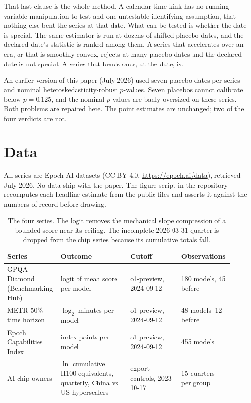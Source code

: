 \documentclass[11pt]{article}
\begin{document}
That last clause is the whole method. A calendar-time kink has no running-variable
manipulation to test and one untestable identifying assumption, that nothing else bent
the series at that date. What can be tested is whether the date is special. The same
estimator is run at dozens of shifted placebo dates, and the declared date's statistic
is ranked among them. A series that accelerates over an era, or that is smoothly convex,
rejects at many placebo dates and the declared date is not special. A series that bends
once, at the date, is.

An earlier version of this paper (July 2026) used seven placebo dates per series and
nominal heteroskedasticity-robust $p$-values. Seven placebos cannot calibrate below
$p = 0.125$, and the nominal $p$-values are badly oversized on these series. Both
problems are repaired here. The point estimates are unchanged; two of the four verdicts
are not.

\section{Data}\label{sec:data}

All series are Epoch AI datasets (CC-BY 4.0, \url{https://epoch.ai/data}), retrieved
July 2026. No data ship with the paper. The figure script in the repository recomputes
each headline estimate from the public files and asserts it against the numbers of
record before drawing.

\begin{table}[h]
\centering
\small
\begin{tabular}{@{}p{0.23\linewidth}p{0.30\linewidth}p{0.22\linewidth}p{0.17\linewidth}@{}}
\toprule
Series & Outcome & Cutoff & Observations \\
\midrule
GPQA-Diamond (Benchmarking Hub) & logit of mean score per model & o1-preview, 2024-09-12 & 180 models, 45 before \\
METR 50\% time horizon & $\log_2$ minutes per model & o1-preview, 2024-09-12 & 48 models, 12 before \\
Epoch Capabilities Index & index points per model & o1-preview, 2024-09-12 & 455 models \\
AI chip owners & $\ln$ cumulative H100-equivalents, quarterly, China vs US hyperscalers & export controls, 2023-10-17 & 15 quarters per group \\
\bottomrule
\end{tabular}
\caption{The four series. The logit removes the mechanical slope compression of a
bounded score near its ceiling. The incomplete 2026-03-31 quarter is dropped from the
chip series because its cumulative totals fall.}
\label{tab:data}
\end{table}
\end{document}
